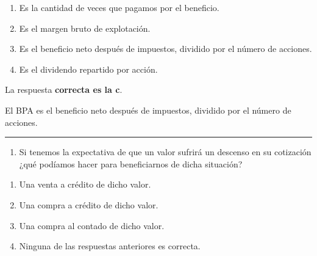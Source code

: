 \documentclass[
  letterpaper,
  DIV=11,
  numbers=noendperiod]{scrreprt}
\providecommand{\tightlist}{%
  \setlength{\itemsep}{0pt}\setlength{\parskip}{0pt}}\usepackage{longtable,booktabs,array}
\begin{document}
\begin{enumerate}
\def\labelenumi{\alph{enumi}.}
\item
  Es la cantidad de veces que pagamos por el beneficio.
\item
  Es el margen bruto de explotación.
\item
  Es el beneficio neto después de impuestos, dividido por el número de
  acciones.
\item
  Es el dividendo repartido por acción.
\end{enumerate}

\begin{tcolorbox}[enhanced jigsaw, left=2mm, opacityback=0, colback=white, breakable, arc=.35mm, bottomrule=.15mm, rightrule=.15mm, toprule=.15mm, leftrule=.75mm, colframe=quarto-callout-tip-color-frame]
\begin{minipage}[t]{5.5mm}
\textcolor{quarto-callout-tip-color}{\faLightbulb}
\end{minipage}%
\begin{minipage}[t]{\textwidth - 5.5mm}

La respuesta \textbf{correcta es la c}.

El BPA es el beneficio neto después de impuestos, dividido por el número
de acciones.

\end{minipage}%
\end{tcolorbox}

\begin{center}\rule{0.5\linewidth}{0.5pt}\end{center}

\begin{enumerate}
\def\labelenumi{\arabic{enumi}.}
\setcounter{enumi}{82}
\tightlist
\item
  Si tenemos la expectativa de que un valor sufrirá un descenso en su
  cotización ¿qué podíamos hacer para beneficiarnos de dicha situación?
\end{enumerate}

\begin{enumerate}
\def\labelenumi{\alph{enumi}.}
\item
  Una venta a crédito de dicho valor.
\item
  Una compra a crédito de dicho valor.
\item
  Una compra al contado de dicho valor.
\item
  Ninguna de las respuestas anteriores es correcta.
\end{enumerate}
\end{document}

